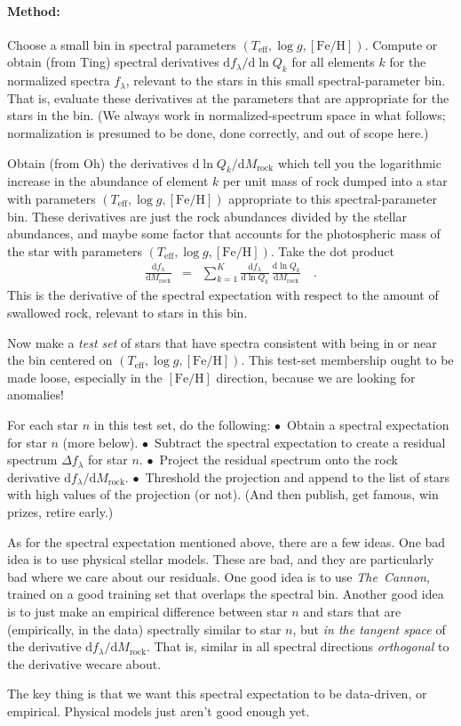 \documentclass[12pt]{article}
\newcommand{\project}[1]{\textsl{#1}}
\newcommand{\TheCannon}{\project{The~Cannon}}
\newcommand{\dd}{\mathrm{d}}
\newcommand{\teff}{T_{\mathrm{eff}}}
\newcommand{\logg}{\log g}
\newcommand{\feh}{[\mathrm{Fe}/\mathrm{H}]}
\newcommand{\rock}{\mathrm{rock}}
\begin{document}
\paragraph{Method:}
Choose a small bin in spectral parameters $(\teff, \logg, \feh)$.
Compute or obtain (from Ting) spectral derivatives $\dd f_\lambda/\dd\ln Q_k$ for
all elements $k$ for the normalized spectra $f_\lambda$, relevant
to the stars in this small spectral-parameter bin.
That is, evaluate these derivatives at the parameters that are
appropriate for the stars in the bin.
(We always work in normalized-spectrum space in what follows; normalization
is presumed to be done, done correctly, and out of scope here.)

Obtain (from Oh) the derivatives $\dd\ln Q_k/\dd M_\rock$ which tell
you the logarithmic increase in the abundance of element $k$ per unit
mass of rock dumped into a star with parameters $(\teff, \logg, \feh)$
appropriate to this spectral-parameter bin.
These derivatives are just the rock abundances divided by the stellar
abundances, and maybe some factor that accounts for the photospheric
mass of the star with parameters $(\teff, \logg, \feh)$.
Take the dot product
\begin{eqnarray}
  \frac{\dd f_\lambda}{\dd M_\rock} &=&
  \sum_{k=1}^K \frac{\dd f_\lambda}{\dd\ln Q_k}\,\frac{\dd\ln Q_k}{\dd M_\rock}
  \quad .
\end{eqnarray}
This is the derivative of the spectral expectation with respect to
the amount of swallowed rock, relevant to stars in this bin.

Now make a \emph{test set} of
stars that have spectra consistent with being in or near
the bin centered on $(\teff, \logg, \feh)$.
This test-set membership ought to be made loose, especially in the $\feh$
direction, because we are looking for anomalies!

For each star $n$ in this test set, do the following:
$\bullet$~Obtain a spectral expectation for star $n$ (more below).
$\bullet$~Subtract the spectral expectation to create a residual spectrum
          $\Delta f_\lambda$ for star $n$.
$\bullet$~Project the residual spectrum onto the rock derivative
          $\dd f_\lambda / \dd M_\rock$.
$\bullet$~Threshold the projection and append to the list of stars with
          high values of the projection (or not).
(And then publish, get famous, win prizes, retire early.)

As for the spectral expectation mentioned above, there are a few ideas.
One bad idea is to use physical stellar models. These are bad, and they
are particularly bad where we care about our residuals. One good idea
is to use \TheCannon, trained on a good training set that overlaps the
spectral bin.
Another good idea is to just make an empirical difference between star
$n$ and stars that are (empirically, in the data) spectrally similar to
star $n$, but \emph{in the tangent space} of the derivative 
${\dd f_\lambda}/{\dd M_\rock}$.
That is, similar in all spectral directions \emph{orthogonal}
to the derivative wecare about.

The key thing is that we want this spectral expectation to be data-driven,
or empirical.
Physical models just aren't good enough yet.
\end{document}
